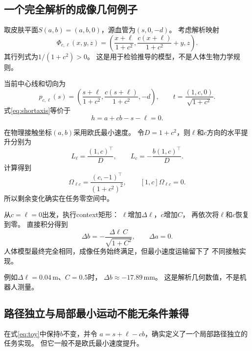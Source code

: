 \documentclass[UTF8,11pt,a4paper,fontset=fandol]{ctexart}
\numberwithin{equation}{section}
\theoremstyle{definition}
\begin{document}
\subsection{一个完全解析的成像几何例子}

取皮肤平面$S(a,b)=(a,b,0)$，源血管为$(s,0,-d)$。
考虑解析映射
\begin{equation}
 \Phi_{c,\ell}(x,y,z)
 =
 \left(
 \frac{x+\ell}{1+c^2},
 \frac{c(x+\ell)}{1+c^2}+y,
 z
 \right).
 \label{eq:analyticmap}
\end{equation}
其行列式为$1/(1+c^2)>0$。
这是用于检验推导的模型，不是人体生物力学规则。

当前中心线和切向为
\begin{equation}
 p_{c,\ell}(s)=
 \left(
 \frac{s+\ell}{1+c^2},
 \frac{c(s+\ell)}{1+c^2},-d
 \right),\qquad
 t=\frac{(1,c,0)}{\sqrt{1+c^2}}.
\end{equation}
式\eqref{eq:shortaxis}等价于
\begin{equation}
 \boxed{h=a+cb-s-\ell=0.}
 \label{eq:toy}
\end{equation}

在物理接触坐标$(a,b)$采用欧氏最小速度。
令$D=1+c^2$，则$\ell$和$c$方向的水平提升分别为
\begin{equation}
 L_\ell=\frac{(1,c)^\top}{D},
 \qquad
 L_c=-\frac{b(1,c)^\top}{D}.
\end{equation}
计算得到
\begin{equation}
 \boxed{
 \Omega_{\ell c}=\frac{(c,-1)^\top}{(1+c^2)^2},
 \qquad [1,c]\Omega_{\ell c}=0.
 }
\end{equation}
所以剩余变化确实在任务零空间中。

从$c=\ell=0$出发，执行context矩形：
$\ell$增加$\Delta\ell$，$c$增加$C$，
再依次将$\ell$和$c$恢复到零。
直接积分得到
\begin{equation}
 \boxed{
 \Delta b=-\frac{\Delta\ell\,C}{\sqrt{1+C^2}},
 \qquad \Delta a=0.
 }
 \label{eq:holonomyexact}
\end{equation}
人体模型最终完全相同，成像任务始终满足，但最小速度运输留下了
不同接触实现。

例如$\Delta\ell=0.04\,\mathrm m$、$C=0.5$时，
$\Delta b\approx-17.89\,\mathrm{mm}$。
这是解析几何数值，不是机器人测量。

\subsection{路径独立与局部最小运动不能无条件兼得}

在式\eqref{eq:toy}中保持$b$不变，并令
$a=s+\ell-cb$，确实定义了一个局部路径独立的任务实现。
但它一般不是欧氏最小速度提升。
\end{document}
